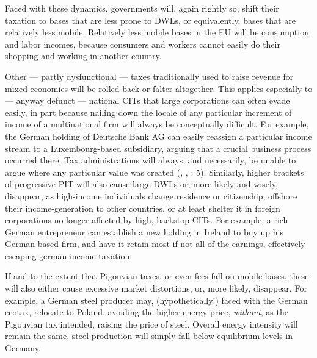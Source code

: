 Faced with these dynamics, governments will, again rightly so, shift their taxation to bases that are less prone to \glspl{DWL}, or equivalently, bases that are relatively less mobile. Relatively less mobile bases in the \gls{EU} will be consumption and labor incomes, because consumers and workers cannot easily do their shopping and working in another country. 

Other --- partly dysfunctional --- taxes traditionally used to raise revenue for mixed economies will be rolled back or falter altogether. This applies especially to --- anyway defunct --- national \glspl{CIT} that large corporations can often evade easily, in part because nailing down the locale of any particular increment of income of a multinational firm will always be conceptually difficult. For example, the German holding of Deutsche Bank AG can easily reassign a particular income stream to a Luxembourg-based subsidiary, arguing that a crucial business process occurred there. Tax administrations will always, and necessarily, be unable to argue where any particular value was created (\citealt{Ganghof2006}, \citealt{Ganghof}, \citealt{Ganghof2007}: 5). Similarly, higher brackets of progressive \gls{PIT} will also cause large \glspl{DWL} or, more likely and wisely, disappear, as high-income individuals change residence or citizenship, offshore their income-generation to other countries, or at least shelter it in foreign corporations no longer affected by high, backstop \glspl{CIT}. For example, a rich German entrepreneur can establish a new holding in Ireland to buy up his German-based firm, and have it retain most if not all of the earnings, effectively escaping german income taxation. 

If and to the extent that Pigouvian taxes, or even fees fall on mobile bases, these will also either cause excessive market distortions, or, more likely, disappear. For example, a German steel producer may, (hypothetically!) faced with the German ecotax, relocate to Poland, avoiding the higher energy price, \emph{without}, as the Pigouvian tax intended, raising the price of steel. Overall energy intensity will remain the same, steel production will simply fall below equilibrium levels in Germany.

